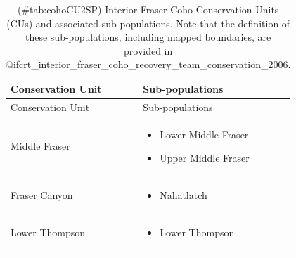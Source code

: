 \documentclass[
]{article}
\providecommand{\tightlist}{%
  \setlength{\itemsep}{0pt}\setlength{\parskip}{0pt}}
\begin{document}
\begin{longtable}[]{@{}ll@{}}
\caption{(\#tab:cohoCU2SP) Interior Fraser Coho Conservation Units (CUs)
and associated sub-populations. Note that the definition of these
sub-populations, including mapped boundaries, are provided in
@ifcrt\_interior\_fraser\_coho\_recovery\_team\_conservation\_2006.}\tabularnewline
\toprule
\begin{minipage}[b]{0.26\columnwidth}\raggedright
Conservation Unit\strut
\end{minipage} & \begin{minipage}[b]{0.43\columnwidth}\raggedright
Sub-populations\strut
\end{minipage}\tabularnewline
\midrule
\endfirsthead
\toprule
\begin{minipage}[b]{0.26\columnwidth}\raggedright
Conservation Unit\strut
\end{minipage} & \begin{minipage}[b]{0.43\columnwidth}\raggedright
Sub-populations\strut
\end{minipage}\tabularnewline
\midrule
\endhead
\begin{minipage}[t]{0.26\columnwidth}\raggedright
Middle Fraser\strut
\end{minipage} & \begin{minipage}[t]{0.43\columnwidth}\raggedright
\begin{itemize}
\tightlist
\item
  Lower Middle Fraser
\item
  Upper Middle Fraser
\end{itemize}\strut
\end{minipage}\tabularnewline
\begin{minipage}[t]{0.26\columnwidth}\raggedright
Fraser Canyon\strut
\end{minipage} & \begin{minipage}[t]{0.43\columnwidth}\raggedright
\begin{itemize}
\tightlist
\item
  Nahatlatch
\end{itemize}\strut
\end{minipage}\tabularnewline
\begin{minipage}[t]{0.26\columnwidth}\raggedright
Lower Thompson\strut
\end{minipage} & \begin{minipage}[t]{0.43\columnwidth}\raggedright
\begin{itemize}
\tightlist
\item
  Lower Thompson

\end{itemize}
\end{minipage}
\end{longtable}
\end{document}
